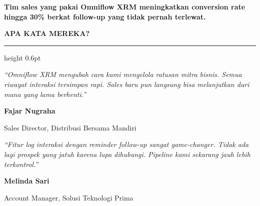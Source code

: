 \documentclass[a4paper]{article}
\newcommand{\sectiontitle}[1]{%
    \vspace{10pt}%
    {\fontsize{13}{16}\selectfont\bfseries\color{BlueDark} #1}\par\vspace{3pt}%
    {\color{BluePrimary}\hrule height 0.6pt}\par\vspace{8pt}%
}
\begin{document}
\vspace{8pt}

{\setlength{\fboxsep}{7pt}\setlength{\fboxrule}{0pt}%
\noindent\colorbox{RosePrimary}{%
    \begin{minipage}{\dimexpr\textwidth-2\fboxsep\relax}
        \centering
        {\fontsize{9.5}{12}\selectfont\bfseries\color{White}
        Tim sales yang pakai Omniflow XRM meningkatkan \textbf{conversion rate hingga 30\%} berkat follow-up yang tidak pernah terlewat.}
    \end{minipage}}}

\vspace{8pt}
\sectiontitle{APA KATA MEREKA?}

\noindent
\begin{minipage}[t]{0.485\textwidth}
    \colorbox{BlueBg}{%
        \begin{minipage}{\dimexpr\linewidth-2\fboxsep\relax}
            {\fontsize{9.5}{13}\selectfont\color{TextDark}\textit{``Omniflow XRM mengubah cara kami mengelola ratusan mitra bisnis. Semua riwayat interaksi tersimpan rapi. Sales baru pun langsung bisa melanjutkan dari mana yang lama berhenti.''}}\par\vspace{4pt}
            {\fontsize{8.5}{11}\selectfont\bfseries\color{BluePrimary} Fajar Nugraha}\par
            {\fontsize{8}{10}\selectfont\color{TextLight} Sales Director, Distribusi Bersama Mandiri}
        \end{minipage}}
\end{minipage}%
\hfill
\begin{minipage}[t]{0.485\textwidth}
    \colorbox{BlueBg}{%
        \begin{minipage}{\dimexpr\linewidth-2\fboxsep\relax}
            {\fontsize{9.5}{13}\selectfont\color{TextDark}\textit{``Fitur log interaksi dengan reminder follow-up sangat game-changer. Tidak ada lagi prospek yang jatuh karena lupa dihubungi. Pipeline kami sekarang jauh lebih terkontrol.''}}\par\vspace{4pt}
            {\fontsize{8.5}{11}\selectfont\bfseries\color{BluePrimary} Melinda Sari}\par
            {\fontsize{8}{10}\selectfont\color{TextLight} Account Manager, Solusi Teknologi Prima}
        \end{minipage}}
\end{minipage}

\restoregeometry
\end{document}
